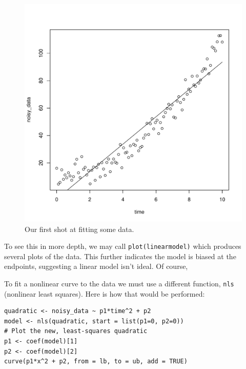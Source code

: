 \documentclass[12pt]{article}
\theoremstyle{remark}
\begin{document}
\begin{figure}[ht]
\label{linear}
\centering
\includegraphics[scale=0.5]{linear_model}
\caption{Our first shot at fitting some data.}
\end{figure}

To see this in more depth, we may call \verb|plot(linearmodel)| which produces several plots of the data. This further indicates the model is biased at the endpoints, suggesting a linear model isn't ideal. Of course, 

To fit a nonlinear curve to the data we must use a different function, \verb|nls| (nonlinear least squares). Here is how that would be performed:
\begin{Verbatim}[frame=single, fontsize=\small]
quadratic <- noisy_data ~ p1*time^2 + p2
model <- nls(quadratic, start = list(p1=0, p2=0))
# Plot the new, least-squares quadratic
p1 <- coef(model)[1]
p2 <- coef(model)[2]
curve(p1*x^2 + p2, from = lb, to = ub, add = TRUE)
\end{Verbatim}

\end{document}
